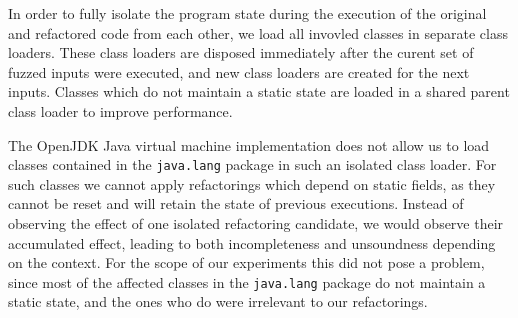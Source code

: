 \documentclass[sigconf,review,anonymous]{acmart}
\begin{document}
In order to fully isolate the program state during the execution of the original
and refactored code from each other, we load all invovled classes in separate
class loaders. These class loaders are disposed immediately after the curent set
of fuzzed inputs were executed, and new class loaders are created for the next
inputs. Classes which do not maintain a static state are loaded in a shared
parent class loader to improve performance.

The OpenJDK Java virtual machine implementation does not allow us to load
classes contained in the \texttt{java.lang} package in such an isolated class
loader. For such classes we cannot apply refactorings which depend on static
fields, as they cannot be reset and will retain the state of previous
executions. Instead of observing the effect of one isolated refactoring
candidate, we would observe their accumulated effect, leading to both
incompleteness and unsoundness depending on the context. For the scope of our
experiments this did not pose a problem, since most of the affected classes in
the \texttt{java.lang} package do not maintain a static state, and the ones who do
were irrelevant to our refactorings.





\end{document}
